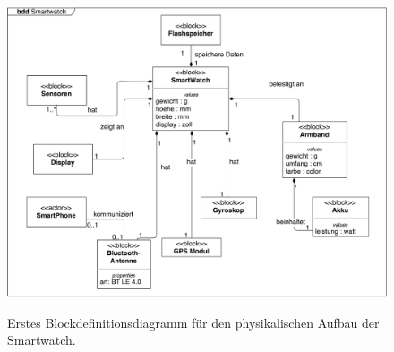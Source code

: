 \begin{figure}[htb]
\centering\
\includegraphics[width=\textwidth]{img/block1}
\caption{Erstes Blockdefinitionsdiagramm für den physikalischen Aufbau der Smartwatch.}\label{fig:block1}
\end{figure}